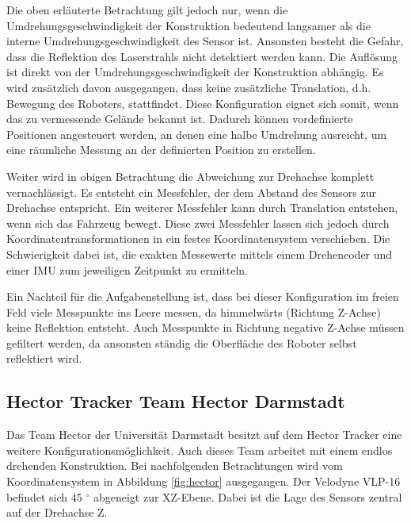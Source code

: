 Die oben erläuterte Betrachtung gilt jedoch nur, wenn die Umdrehungsgeschwindigkeit der Konstruktion bedeutend langsamer als die interne Umdrehungsgeschwindigkeit des Sensor ist. Ansonsten besteht die Gefahr, dass die Reflektion des Laserstrahls nicht detektiert werden kann. Die Auflösung ist direkt von der Umdrehungsgeschwindigkeit der Konstruktion abhängig. Es wird zusätzlich davon ausgegangen, dass keine zusätzliche Translation, d.h. Bewegung des Roboters, stattfindet. Diese Konfiguration eignet sich somit, wenn das zu vermessende Gelände bekannt ist. Dadurch können vordefinierte Positionen angesteuert werden, an denen eine halbe Umdrehung ausreicht, um eine räumliche Messung an der definierten Position zu erstellen. 

Weiter wird in obigen Betrachtung die Abweichung zur Drehachse komplett vernachlässigt. Es entsteht ein Messfehler, der dem Abstand des Sensors zur Drehachse entspricht. Ein weiterer Messfehler kann durch Translation entstehen, wenn sich das Fahrzeug bewegt. Diese zwei Messfehler lassen sich jedoch durch Koordinatentransformationen in ein festes Koordinatensystem verschieben. Die Schwierigkeit dabei ist, die exakten Messewerte mittels einem Drehencoder und einer \ac{IMU} zum jeweiligen Zeitpunkt zu ermitteln. 

Ein Nachteil für die Aufgabenstellung ist, dass bei dieser Konfiguration im freien Feld viele Messpunkte ins Leere messen, da himmelwärts (Richtung Z-Achse) keine Reflektion entsteht. Auch Messpunkte in Richtung negative Z-Achse müssen gefiltert werden, da ansonsten ständig die Oberfläche des Roboter selbst reflektiert wird.

\subsection{Hector Tracker Team Hector Darmstadt}
 \label{subsec:hector}
Das Team Hector der Universität Darmstadt besitzt auf dem Hector Tracker eine weitere Konfigurationsmöglichkeit. Auch dieses Team arbeitet mit einem endlos drehenden Konstruktion. Bei nachfolgenden Betrachtungen wird vom Koordinatensystem in Abbildung \ref{fig:hector} ausgegangen. Der Velodyne VLP-16 befindet sich 45 $^\circ$ abgeneigt zur XZ-Ebene. Dabei ist die Lage des Sensors zentral auf der Drehachse Z.

